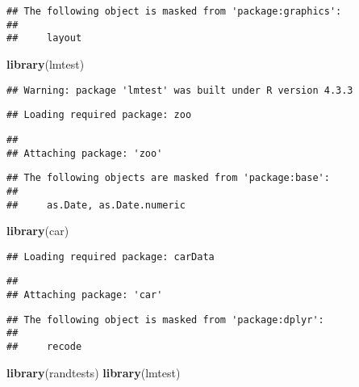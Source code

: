 \documentclass[
]{article}
\newenvironment{Shaded}{\begin{snugshade}}{\end{snugshade}}
\newcommand{\FunctionTok}[1]{\textcolor[rgb]{0.13,0.29,0.53}{\textbf{#1}}}
\newcommand{\NormalTok}[1]{#1}
\begin{document}
\begin{verbatim}
## The following object is masked from 'package:graphics':
## 
##     layout
\end{verbatim}

\begin{Shaded}
\begin{Highlighting}[]
\FunctionTok{library}\NormalTok{(lmtest)}
\end{Highlighting}
\end{Shaded}

\begin{verbatim}
## Warning: package 'lmtest' was built under R version 4.3.3
\end{verbatim}

\begin{verbatim}
## Loading required package: zoo
\end{verbatim}

\begin{verbatim}
## 
## Attaching package: 'zoo'
\end{verbatim}

\begin{verbatim}
## The following objects are masked from 'package:base':
## 
##     as.Date, as.Date.numeric
\end{verbatim}

\begin{Shaded}
\begin{Highlighting}[]
\FunctionTok{library}\NormalTok{(car)}
\end{Highlighting}
\end{Shaded}

\begin{verbatim}
## Loading required package: carData
\end{verbatim}

\begin{verbatim}
## 
## Attaching package: 'car'
\end{verbatim}

\begin{verbatim}
## The following object is masked from 'package:dplyr':
## 
##     recode
\end{verbatim}

\begin{Shaded}
\begin{Highlighting}[]
\FunctionTok{library}\NormalTok{(randtests)}
\FunctionTok{library}\NormalTok{(lmtest)}
\end{Highlighting}
\end{Shaded}
\end{document}
